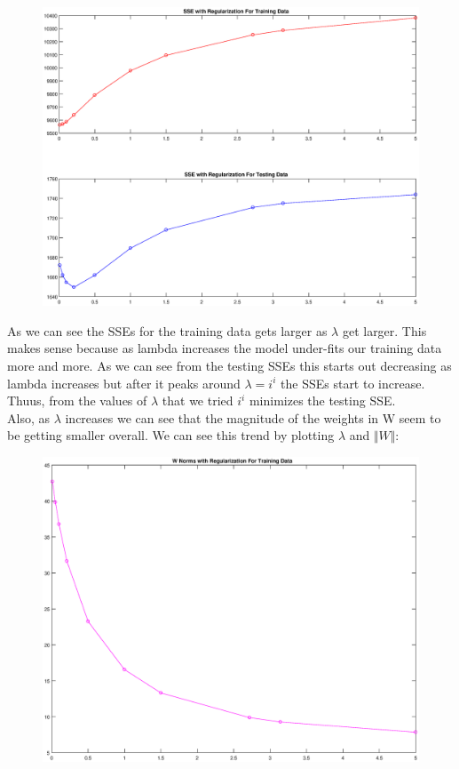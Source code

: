 \documentclass{article}
\begin{document}
	\begin{figure}[h!]
		\begin{center} 
			\includegraphics[scale=0.45]{lambda_figure.eps} 
		\end{center}  
		\label{fig:M2}
	\end{figure}

As we can see the SSEs for the training data gets larger as $\lambda$ get larger. This makes sense because as lambda increases the model under-fits our training data more and more. As we can see from the testing SSEs this starts out decreasing as lambda increases but after it peaks around $\lambda = i^{i}$ the SSEs start to increase. Thuus, from the values of $\lambda$ that we tried $i^i$ minimizes the testing SSE. \\ 
	
Also, as $\lambda$ increases we can see that the magnitude of the weights in W seem to be getting smaller overall. We can see this trend by plotting $\lambda$ and $\Vert W \Vert$:

	
	\begin{figure}[h!]
		\begin{center} 
			\includegraphics[scale=0.45]{lambda_norm.eps} 
		\end{center}  
		\label{fig:M3}
	\end{figure}
\newpage
\end{document}
